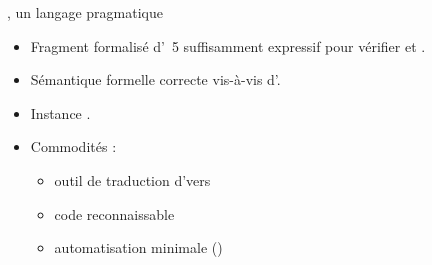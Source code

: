 \begin{frame}{\Zoo, un langage pragmatique}
\centering
\Large
\begin{itemize}
  \item Fragment formalisé d'\OCaml~5 suffisamment expressif pour vérifier \Saturn et \Kcas.
  \item Sémantique formelle correcte vis-à-vis d'\OCaml.
  \setlength\itemsep{1.5em}
  \item Instance \Iris.
  \item Commodités :
    \begin{itemize}
      \normalsize
      \item outil de traduction d'\OCaml vers \Zoo
      \item code reconnaissable
      \item automatisation minimale (\Diaframe)
    \end{itemize}
\end{itemize}
\end{frame}
